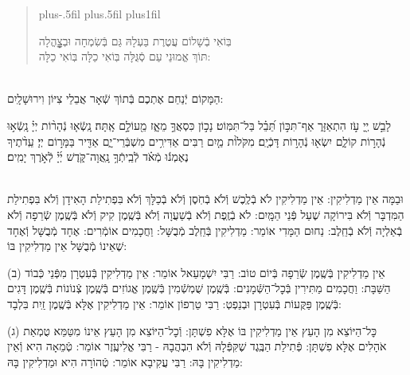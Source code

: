 \documentclass[twoside, openany, parskip=half, 11pt]{book}
\begin{document}
\begin{quote}
 \leftskip=0pt plus-.5fil
 \rightskip=0pt plus.5fil
 \parfillskip=0pt plus1fil

 בּֽוֹאִי בְֿשָׁלוֹם עֲטֶרֶת בַּעְלָהּ \hfill
גַּם בְּֿשִׂמְחָה וּבְצׇׇׇׇׇׇׇׇָהֳלָה \\
תּוֹךְ אֱמוּנֵי עַם סְֿגֻּלָּה \hfill
בּֽוֹאִי כַלָּה בּֽוֹאִי כַלָּה:

\lechadodi

\end{quote}

\begin{sometimes}
	
	\\
	הַמָּקוֹם יְֿנַחֵם אֶתְכֶם בְּֿתוֹךְ שְֿׁאָר אֲבֵלֵי צִיּוֹן וִירוּשָׁלָֽיִם:
	
\end{sometimes}


\mizmorshabbat

 לָבֵ֣שׁ יְ֖יָ עֹ֣ז הִתְאַזָּר֑ אַף־תִּכּ֣וֹן תֵּ֝בֵ֗ל בַּל־תִּמּֽוֹט׃
נָכ֣וֹן כִּסְאֲךָ֣ מֵאָ֑ז מֵ֖עוֹלָ֣ם אָֽתָּה׃
נָֽשְֿׂא֤וּ נְֿהָר֨וֹת יְיָ֗ נָֽשְֿׂא֣וּ נְֿהָר֣וֹת קוֹלָ֑ם יִשְׂא֖וּ נְֿהָר֣וֹת דָּכְֿיָֽם׃
מִקֹּלוֹ֨ת מַ֤יִם רַבִּים אַדִּירִ֥ים מִשְׁבְּֿרֵי־יָ֑ם אַדִּ֖יר בַּמָּר֣וֹם יְיָ׃
עֵֽדֹ֨תֶיךָ נֶאֶמְנ֬וּ מְֿאֹ֗ד לְֿבֵֽיתְֿךָ֥ נָֽאֲוָה־קֹּ֑דֶשׁ יְ֜יָ֗ לְֿאֹ֣רֶךְ יָמִֽים׃

\mournerskaddish


\\
וּבַמָּה אֵין מַדְלִיקִין: אֵין מַדְלִיקִין לֹא בְֿלֶֽכֶשׁ וְֿלֹא בְֿחֹֽסֶן וְֿלֹא בְֿכַלָּךְ וְֿלֹא בִּפְתִילַת הָאִידָן וְֿלֹא בִּפְתִילַת הַמִּדְבָּר וְֿלֹא בִּירוֹקָה שֶׁעַל פְּֿנֵי הַמָּֽיִם: לֹא בְֿזֶֽפֶת וְֿלֹא בְֿשַׁעֲוָה וְֿלֹא בְּֿשֶֽׁמֶן קִיק וְֿלֹא בְּֿשֶֽׁמֶן שְֿׂרֵפָה וְֿלֹא בְֿאַלְיָה וְֿלֹא בְֿחֵֽלֶב: נַחוּם הַמָּדִי אוֹמֵר: מַדְלִיקִין בְּֿחֵֽלֶב מְֿבֻשָּׁל: וַחֲכָמִים אוֹמְֿרִים: אֶחָד מְֿבֻשָּׁל וְֿאֶחָד שֶׁאֵינוֹ מְֿבֻשָּׁל אֵין מַדְלִיקִין בּוֹ:

(ב) אֵין מַדְלִיקִין בְּֿשֶֽׁמֶן שְֿׂרֵפָה בְּֿיוֹם טוֹב: רַבִּי יִשְׁמָעֵאל אוֹמֵר: אֵין מַדְלִיקִין בְּֿעִטְרָן מִפְּֿנֵי כְּֿבוֹד הַשַּׁבָּת: וַחֲכָמִים מַתִּירִין בְּֿכׇל־הַשְּֿׁמָנִים: בְּֿשֶֽׁמֶן שֻׁמְשְֿׁמִין בְּֿשֶֽׁמֶן אֱגוֹזִים בְּֿשֶֽׁמֶן צְֿנוֹנוֹת בְּֿשֶֽׁמֶן דָּגִים בְּֿשֶֽׁמֶן פַּקֻּעוֹת בְּֿעִטְרָן וּבְנֵפְטְ: רַבִּי טַרְפוֹן אוֹמֵר: אֵין מַדְלִיקִין אֶלָּא בְּֿשֶֽׁמֶן זַֽיִת בִּלְבָד:

(ג) כׇּל־הַיּוֹצֵא מִן הָעֵץ אֵין מַדְלִיקִין בּוֹ אֶלָּא פִשְׁתָּן: וְֿכׇל־הַיּוֹצֵא מִן הָעֵץ אֵינוֹ מִטַּמֵּא טֻמְאַת אֹהָלִים אֶלָּא פִשְׁתָּן: פְּֿתִילַת הַבֶּֽגֶד שֶׁקִּפְּֿלָהּ וְֿלֹא הִבְהֲבָהּ - רַבִּי אֱלִיעֶֽזֶר אוֹמֵר: טְֿמֵאָה הִיא וְֿאֵין מַדְלִיקִין בָּהּ: רַבִּי עֲקִיבָא אוֹמֵר: טְֿהוֹרָה הִיא וּמַדְלִיקִין בָּהּ:
\end{document}

